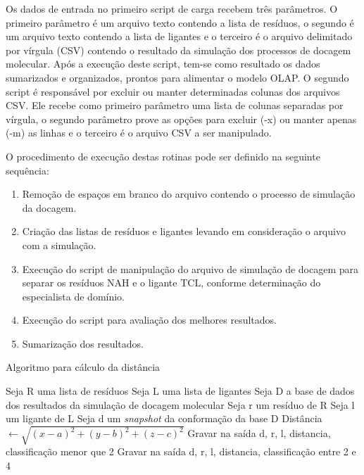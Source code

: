 Os dados de entrada no primeiro script de carga recebem três parâmetros. O primeiro parâmetro é um arquivo texto contendo a lista de resíduos, o segundo é um arquivo texto contendo a lista de ligantes e o terceiro é o arquivo delimitado por vírgula (CSV) contendo o resultado da simulação dos processos de docagem molecular. Após a execução deste script, tem-se como resultado os dados sumarizados e organizados, prontos para alimentar o modelo OLAP. O segundo script é responsável por excluir ou manter determinadas colunas dos arquivos CSV. Ele recebe como primeiro parâmetro uma lista de colunas separadas por vírgula, o segundo parâmetro prove as opções para excluir (-x) ou manter apenas (-m) as linhas e o terceiro é o arquivo CSV a ser manipulado.

O procedimento de execução destas rotinas pode ser definido na seguinte sequência:

\begin{enumerate}
    \item Remoção de espaços em branco do arquivo contendo o processo de simulação da docagem. 
    \item Criação das listas de resíduos e ligantes levando em consideração o arquivo com a simulação.
    \item Execução do script de manipulação do arquivo de simulação de docagem para separar os resíduos NAH e o ligante TCL, conforme determinação do especialista de domínio.
    \item Execução do script para avaliação dos melhores resultados.
    \item Sumarização dos resultados.
\end{enumerate}


\renewcommand{\algorithmicfor}{\textbf{para}}
\renewcommand{\algorithmicif}{\textbf{se}}
\renewcommand{\algorithmicthen}{\textbf{então}}
\renewcommand{\algorithmicelse}{\textbf{senão}}
\renewcommand{\algorithmicendif}{\textbf{fim se}}
\renewcommand{\algorithmicendfor}{\textbf{fim para}}
\renewcommand{\algorithmicdo}{\textbf{faça}}

\begin{algorithm}[H]
\caption{Algoritmo para cálculo da distância}
\label{alg:CalculoDistancia}
{\fontsize{10}{10}\selectfont
\begin{algorithmic}[1]
	\STATE Seja R uma lista de resíduos
	\STATE Seja L uma lista de ligantes
	\STATE Seja D a base de dados dos resultados da simulação de docagem molecular
	\STATE Seja r um resíduo de R
	\STATE Seja l um ligante de L
	\STATE Seja d um \emph{snapshot} da conformação da base D
			\STATE Distância $\gets \sqrt{(x - a)^{2} +(y - b)^{2} + (z - c)^{2}}$ 
			\ENDIF
				\STATE Gravar na saída d, r, l, distancia, classificação menor que 2
				\ELSE
				\STATE Gravar na saída d, r, l, distancia, classificação entre 2 e 4
				\ENDIF
			\ENDIF
			\ENDFOR
		\ENDFOR
	\ENDFOR
\end{algorithmic}
}
\end{algorithm}

